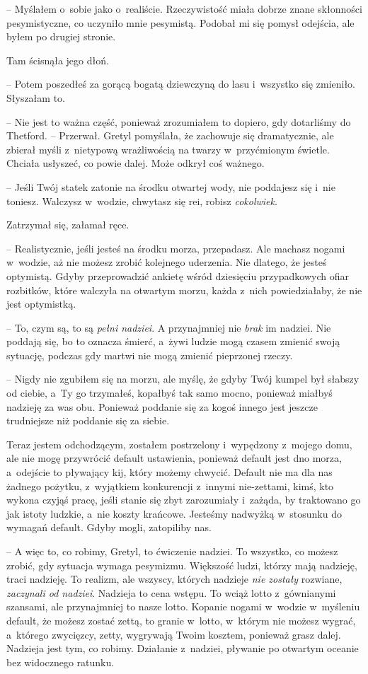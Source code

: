 \documentclass[oneside,polish,11pt,sfheadings]{mwbk}
\begin{document}
-- Myślałem o~sobie jako o~realiście. Rzeczywistość miała dobrze znane
skłonności pesymistyczne, co uczyniło mnie pesymistą. Podobał mi się
pomysł odejścia, ale byłem po drugiej stronie.

Tam ścisnąła jego dłoń. 

-- Potem poszedłeś za gorącą bogatą dziewczyną do
lasu i~wszystko się zmieniło. Słyszałam to.

-- Nie jest to ważna część, ponieważ zrozumiałem to dopiero, gdy
dotarliśmy do Thetford. -- Przerwał. Gretyl pomyślała, że zachowuje się
dramatycznie, ale zbierał myśli z~nietypową wrażliwością na twarzy w~przyćmionym świetle. Chciała usłyszeć, co powie dalej. Może odkrył coś
ważnego.

-- Jeśli Twój statek zatonie na środku otwartej wody, nie poddajesz się i~nie toniesz. Walczysz w~wodzie, chwytasz się rei, robisz
\textit{cokolwiek}.

Zatrzymał się, załamał ręce.

-- Realistycznie, jeśli jesteś na środku morza, przepadasz. Ale machasz
nogami w~wodzie, aż nie możesz zrobić kolejnego uderzenia. Nie dlatego,
że jesteś optymistą. Gdyby przeprowadzić ankietę wśród dziesięciu
przypadkowych ofiar rozbitków, które walczyła na otwartym morzu, każda z~nich powiedziałaby, że nie jest optymistką.

-- To, czym są, to są \textit{pełni nadziei}. A przynajmniej nie
\textit{brak} im nadziei. Nie poddają się, bo to oznacza śmierć, a~żywi
ludzie mogą czasem zmienić swoją sytuację, podczas gdy martwi nie mogą
zmienić pieprzonej rzeczy.

-- Nigdy nie zgubiłem się na morzu, ale myślę, że gdyby Twój kumpel był
słabszy od ciebie, a~Ty go trzymałeś, kopałbyś tak samo mocno, ponieważ
miałbyś nadzieję za was obu. Ponieważ poddanie się za kogoś innego jest
jeszcze trudniejsze niż poddanie się za siebie.

Teraz jestem odchodzącym, zostałem postrzelony i~wypędzony z~mojego
domu, ale nie mogę przywrócić default ustawienia, ponieważ default jest
dno morza, a~odejście to pływający kij, który możemy chwycić. Default
nie ma dla nas żadnego pożytku, z~wyjątkiem konkurencji z~innymi
nie-zettami, kimś, kto wykona czyjąś pracę, jeśli stanie się zbyt
zarozumiały i~zażąda, by traktowano go jak istoty ludzkie, a~nie koszty
krańcowe. Jesteśmy nadwyżką w~stosunku do wymagań default. Gdyby mogli,
zatopiliby nas.

-- A więc to, co robimy, Gretyl, to ćwiczenie nadziei. To wszystko, co
możesz zrobić, gdy sytuacja wymaga pesymizmu. Większość ludzi, którzy
mają nadzieję, traci nadzieję. To realizm, ale wszyscy, których nadzieje
\textit{nie zostały }rozwiane, \textit{zaczynali od nadziei}. Nadzieja to
cena wstępu. To wciąż lotto z~gównianymi szansami, ale przynajmniej to
nasze lotto. Kopanie nogami w~wodzie w~myśleniu default, że możesz
zostać zettą, to granie w~lotto, w~którym nie możesz wygrać, a~którego
zwycięzcy, zetty, wygrywają Twoim kosztem, ponieważ grasz dalej.
Nadzieja jest tym, co robimy. Działanie z~nadziei, pływanie po otwartym
oceanie bez widocznego ratunku.
\end{document}
